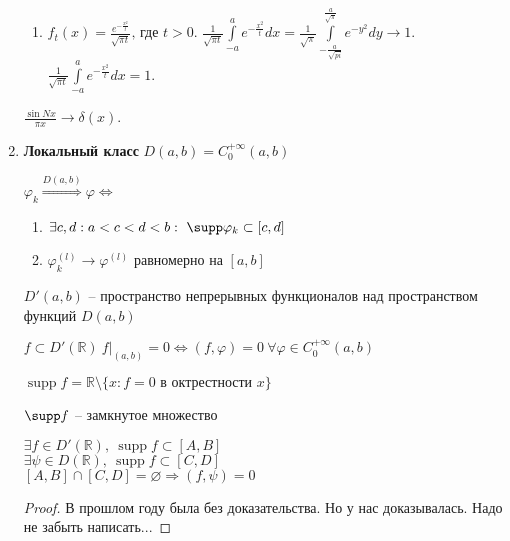 \begin{enumerate}
\begin{example}
\begin{enumerate}
          \item $f_{t} (x) = \frac{e^{- \frac{x^2}{t}}}{\sqrt{\pi t}} \text{, где } t > 0$. $\frac{1}{\sqrt{\pi t}} \int\limits_{- a}^{a} e^{- \frac{x^2}{t}} d x = \frac{1}{\sqrt{\pi}} \int\limits_{- \frac{a}{\sqrt{pi}}}^{\frac{a}{\sqrt{\pi}}} e^{- y^2} d y \rightarrow 1$. $\frac{1}{\sqrt{\pi t}} \int\limits_{- a}^{a} e^{- \frac{x^2}{t}} d x = 1$.
      \end{enumerate}
    \end{example}
    \begin{exercise}
      $\frac{\sin N x}{\pi x} \rightarrow \delta (x)$.
    \end{exercise}
    \item \textbf{Локальный класс}
        $D(a, b) = C_0^{+ \infty} (a, b)$\\
        \begin{definition}
            $\varphi_k \overset{D(a, b)}{\Longrightarrow} \varphi \Leftrightarrow $ 
            \begin{enumerate}
                \item $\exists c, d: a < c < d < b: \ \supp \varphi_k \subset [c, d]$
                \item $\varphi_k^{(l)} \to \varphi^{(l)}$ равномерно на $[a, b]$
            \end{enumerate}
        \end{definition}
        $D'(a,b)$ -- пространство непрерывных функционалов над пространством функций $D (a,b)$
        \begin{definition}
            $f \subset D'(\mathbb{R}) \ f|_{(a,b)} = 0 \Leftrightarrow (f, \varphi) = 0 \ \forall \varphi \in C_0^{+\infty} (a, b)$ 
        \end{definition}
        \begin{definition}
            $\operatorname{supp} f = \mathbb{R} \setminus \{ x: f = 0 \text{ в октрестности } x \}$
        \end{definition}
        $\supp f$ -- замкнутое множество
        \begin{lemma}
            $\exists f \in D'(\mathbb{R}), \ \operatorname{supp} f \subset [A, B]$ \\
            $\exists \psi \in D(\mathbb{R}), \ \operatorname{supp} f \subset [C, D]$\\
            $[A, B] \cap [C, D] = \varnothing \Rightarrow (f, \psi) = 0$
            \begin{proof}
                В прошлом году была без доказательства. Но у нас доказывалась. Надо не забыть написать...

\end{proof}
\end{lemma}
\end{enumerate}
